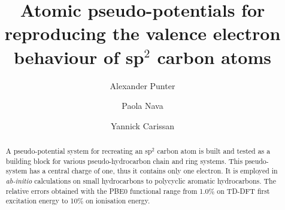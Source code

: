 \documentclass[aip]{revtex4-1}
\begin{document}
\title{Atomic pseudo-potentials for reproducing the valence electron behaviour of sp$^2$ carbon atoms}
\author{Alexander Punter}
\author{Paola Nava}
\author{Yannick Carissan}

\begin{abstract}
A pseudo-potential system for recreating an sp\(^{2}\) carbon atom is built 
and tested as a building block for various pseudo-hydrocarbon chain and ring systems.  
This pseudo-system has a central charge of one, thus it contains only one
electron. It is employed in \textsl{ab-initio} calculations 
on small hydrocarbons to polycyclic aromatic hydrocarbons.
The relative errors obtained with the PBE0 functional range from
1.0\% on TD-DFT first excitation energy to 10\% on ionisation
energy.
\end{abstract}
\maketitle



\begin{figure}[h]
\centering
\colorbox{background-color}{
}
\end{figure}
\end{document}
